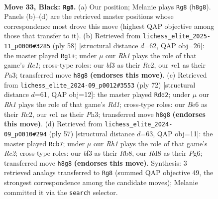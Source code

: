 \documentclass[11pt]{article}
\begin{document}
\clearpage

\begin{figure}[p]\centering
\begin{subfigure}{0.46\textwidth}\centering
\resizebox{\linewidth}{!}{%
\newchessgame
\chessboard[
  setfen={3r1k1r/1p3p1p/4b1p1/p2p4/5P2/3K1BP1/PP5P/2R3RN b - - 0 33},
  showmover=false,
  pgfstyle=straightmove, color=movearrow, markmove={h8-g8}
]}
\caption{}
\end{subfigure}\hfill
\begin{subfigure}{0.46\textwidth}\centering
\resizebox{\linewidth}{!}{%
\newchessgame
\chessboard[
  setfen={3r2k1/3r1p2/1p2p3/2p1b3/7p/P3PP2/1PR1K2P/2B1R3 w - - 0 30},
  showmover=false,
  pgfstyle=straightmove, color=movearrow, markmove={e1-g1}
]}
\caption{}
\end{subfigure}
\\[4pt]
\begin{subfigure}{0.46\textwidth}\centering
\resizebox{\linewidth}{!}{%
\newchessgame
\chessboard[
  setfen={1r2b3/1r4pk/2p2p2/2P1pP2/2B1P2p/7P/1PR3P1/3R3K w - - 0 37},
  showmover=false,
  pgfstyle=straightmove, color=movearrow, markmove={d1-d2}
]}
\caption{}
\end{subfigure}\hfill
\begin{subfigure}{0.46\textwidth}\centering
\resizebox{\linewidth}{!}{%
\newchessgame
\chessboard[
  setfen={1r4k1/2r2p1p/R5p1/2p1p3/2P1P3/1P1R1P1P/4K3/3N2b1 b - - 0 29},
  showmover=false,
  pgfstyle=straightmove, color=movearrow, markmove={c7-b7}
]}
\caption{}
\end{subfigure}
\caption{\textbf{Move 33, Black: \texttt{Rg8}.} (a) Our position; Melanie plays \texttt{Rg8} (\texttt{h8g8}). Panels (b)--(d) are the retrieved master positions whose correspondence most drove this move (highest QAP objective among those that transfer to it). (b) Retrieved from \texttt{lichess\_elite\_2025-11\_p0000\#3285} (ply 58) [structural distance $d$=62, QAP obj=26]: the master played \texttt{Rg1+}; under $\mu$ our \emph{Rh1} plays the role of that game's \emph{Re1}; cross-type roles: our \emph{b}f3 as their \emph{R}c2, our \emph{r}c1 as their \emph{P}a3; transferred move \texttt{h8g8} \textbf{(endorses this move)}. (c) Retrieved from \texttt{lichess\_elite\_2024-09\_p0012\#3553} (ply 72) [structural distance $d$=61, QAP obj=12]: the master played \texttt{Rdd2}; under $\mu$ our \emph{Rh1} plays the role of that game's \emph{Rd1}; cross-type roles: our \emph{B}e6 as their \emph{R}c2, our \emph{r}c1 as their \emph{P}h3; transferred move \texttt{h8g8} \textbf{(endorses this move)}. (d) Retrieved from \texttt{lichess\_elite\_2024-09\_p0010\#294} (ply 57) [structural distance $d$=63, QAP obj=11]: the master played \texttt{Rcb7}; under $\mu$ our \emph{Rh1} plays the role of that game's \emph{Rc2}; cross-type roles: our \emph{b}f3 as their \emph{R}b8, our \emph{R}d8 as their \emph{P}g6; transferred move \texttt{h8g8} \textbf{(endorses this move)}. Synthesis: 3 retrieved analogs transferred to \texttt{Rg8} (summed QAP objective 49, the strongest correspondence among the candidate moves); Melanie committed it via the \texttt{search} selector.}
\label{fig:thought-m65}
\end{figure}
\end{document}
